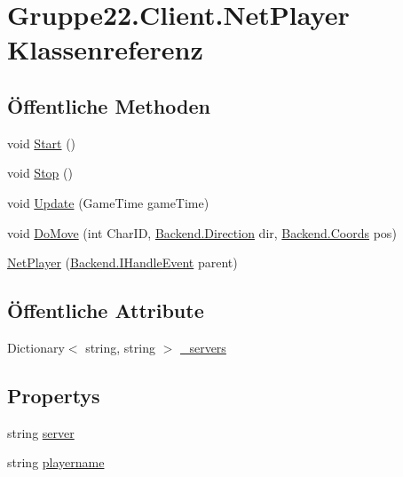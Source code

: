\hypertarget{class_gruppe22_1_1_client_1_1_net_player}{\section{Gruppe22.\-Client.\-Net\-Player Klassenreferenz}
\label{class_gruppe22_1_1_client_1_1_net_player}
}
\subsection*{Öffentliche Methoden}
\begin{DoxyCompactItemize}
\item 
void \hyperlink{class_gruppe22_1_1_client_1_1_net_player_ab69004f431aba560132757ddc248f10d}{Start} ()
\item 
void \hyperlink{class_gruppe22_1_1_client_1_1_net_player_a988e77763c29eccac9d19b17b6650436}{Stop} ()
\item 
void \hyperlink{class_gruppe22_1_1_client_1_1_net_player_ae8f57a7ea6a2aeca629262d7df3a2981}{Update} (Game\-Time game\-Time)
\item 
void \hyperlink{class_gruppe22_1_1_client_1_1_net_player_a2afed4682416d522e896f3e45209e018}{Do\-Move} (int Char\-I\-D, \hyperlink{namespace_gruppe22_1_1_backend_a2d53d5d14b8ea0951ba6971e5da1ebf5}{Backend.\-Direction} dir, \hyperlink{class_gruppe22_1_1_backend_1_1_coords}{Backend.\-Coords} pos)
\item 
\hyperlink{class_gruppe22_1_1_client_1_1_net_player_a9828b0f862a08d56593722849e0dc200}{Net\-Player} (\hyperlink{interface_gruppe22_1_1_backend_1_1_i_handle_event}{Backend.\-I\-Handle\-Event} parent)
\end{DoxyCompactItemize}
\subsection*{Öffentliche Attribute}
\begin{DoxyCompactItemize}
\item 
Dictionary$<$ string, string $>$ \hyperlink{class_gruppe22_1_1_client_1_1_net_player_a9dc0068c252f2e59928f77ae43e76aa1}{\-\_\-servers}
\end{DoxyCompactItemize}
\subsection*{Propertys}
\begin{DoxyCompactItemize}
\item 
string \hyperlink{class_gruppe22_1_1_client_1_1_net_player_a7b62a0490b4c13e5f6c1e2dad62a1916}{server}
\item 
string \hyperlink{class_gruppe22_1_1_client_1_1_net_player_ad1a5e262126571468b615e44674d8be1}{playername}
\end{DoxyCompactItemize}


